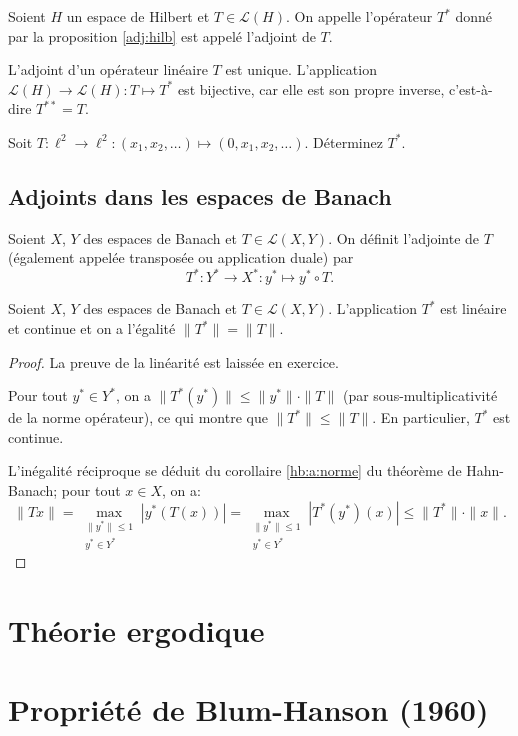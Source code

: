 \begin{df}
  Soient $H$ un espace de Hilbert et $T\in\mathcal L(H)$. On appelle l'opérateur
  $T^*$ donné par la proposition \ref{adj:hilb} est appelé l'adjoint de $T$.
\end{df}

\begin{rem}
  L'adjoint d'un opérateur linéaire $T$ est unique. L'application
  $\mathcal L(H)\to\mathcal L(H): T\mapsto T^*$ est bijective, car elle
  est son propre inverse, c'est-à-dire $T^{**} = T$.
\end{rem}

\begin{exo}
  Soit $T: \ell^2\to \ell^2: (x_1, x_2, \ldots)\mapsto (0, x_1, x_2, \ldots)$.
  Déterminez $T^*$.
\end{exo}
\subsection{Adjoints dans les espaces de Banach}
\begin{df}
  Soient $X$, $Y$ des espaces de Banach et $T\in \mathcal L(X, Y)$.
  On définit l'adjointe de $T$ (également appelée transposée ou application
  duale) par $$T^*: Y^*\to X^*: y^*\mapsto y^*\circ T.$$
\end{df}

\begin{prop}
  Soient $X$, $Y$ des espaces de Banach et $T\in \mathcal L(X, Y)$.
  L'application $T^*$ est linéaire et continue et on a l'égalité
  $\|T^*\| = \|T\|$.
\end{prop}
\begin{proof}
  La preuve de la linéarité est laissée en exercice.

  Pour tout $y^*\in Y^*$, on a $\|T^*(y^*)\| \leq \|y^*\| \cdot \|T\|$ (par
  sous-multiplicativité de la norme opérateur), ce qui montre que
  $\|T^*\| \leq \|T\|$. En particulier, $T^*$ est continue.

  L'inégalité réciproque se déduit du corollaire \ref{hb:a:norme} du théorème
  de Hahn-Banach; pour tout $x\in X$, on a:
  $$\|Tx\| = \max_{\substack{\|y^*\|\leq 1 \\ y^*\in Y^*}}|y^*(T(x))|
  =\max_{\substack{\|y^*\|\leq 1 \\ y^*\in Y^*}}|T^*(y^*)(x)|
  \leq \|T^*\|\cdot \|x\|.$$
\end{proof}
\section{Théorie ergodique}


\section{Propriété de Blum-Hanson (1960)}
